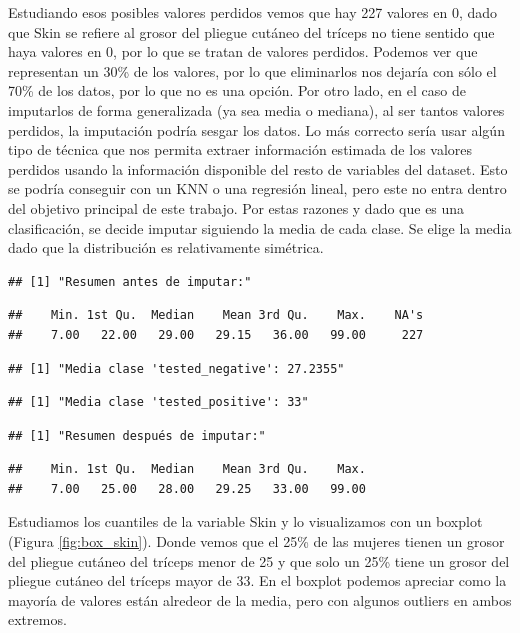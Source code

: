 \documentclass[
]{article}
\begin{document}
Estudiando esos posibles valores perdidos vemos que hay 227 valores en
0, dado que Skin se refiere al grosor del pliegue cutáneo del tríceps no
tiene sentido que haya valores en 0, por lo que se tratan de valores
perdidos. Podemos ver que representan un 30\% de los valores, por lo que
eliminarlos nos dejaría con sólo el 70\% de los datos, por lo que no es
una opción. Por otro lado, en el caso de imputarlos de forma
generalizada (ya sea media o mediana), al ser tantos valores perdidos,
la imputación podría sesgar los datos. Lo más correcto sería usar algún
tipo de técnica que nos permita extraer información estimada de los
valores perdidos usando la información disponible del resto de variables
del dataset. Esto se podría conseguir con un KNN o una regresión lineal,
pero este no entra dentro del objetivo principal de este trabajo. Por
estas razones y dado que es una clasificación, se decide imputar
siguiendo la media de cada clase. Se elige la media dado que la
distribución es relativamente simétrica.

\begin{verbatim}
## [1] "Resumen antes de imputar:"
\end{verbatim}

\begin{verbatim}
##    Min. 1st Qu.  Median    Mean 3rd Qu.    Max.    NA's 
##    7.00   22.00   29.00   29.15   36.00   99.00     227
\end{verbatim}

\begin{verbatim}
## [1] "Media clase 'tested_negative': 27.2355"
\end{verbatim}

\begin{verbatim}
## [1] "Media clase 'tested_positive': 33"
\end{verbatim}

\begin{verbatim}
## [1] "Resumen después de imputar:"
\end{verbatim}

\begin{verbatim}
##    Min. 1st Qu.  Median    Mean 3rd Qu.    Max. 
##    7.00   25.00   28.00   29.25   33.00   99.00
\end{verbatim}

Estudiamos los cuantiles de la variable Skin y lo visualizamos con un
boxplot (Figura \ref{fig:box_skin}). Donde vemos que el 25\% de las
mujeres tienen un grosor del pliegue cutáneo del tríceps menor de 25 y
que solo un 25\% tiene un grosor del pliegue cutáneo del tríceps mayor
de 33. En el boxplot podemos apreciar como la mayoría de valores están
alredeor de la media, pero con algunos outliers en ambos extremos.
\end{document}
